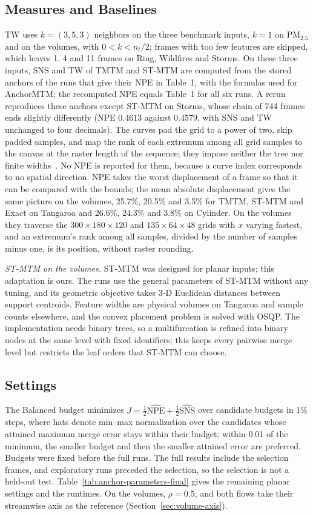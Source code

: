 \documentclass[preprint]{vgtc}
\begin{document}
\subsection{Measures and Baselines}
TW uses $k=(3,5,3)$ neighbors on the three benchmark inputs, $k=1$ on PM$_{2.5}$ and on the volumes, with $0<k<n_t/2$; frames with too few features are skipped, which leaves 1, 4 and 11 frames on Ring, Wildfires and Storms. On these three inputs, SNS and TW of TMTM and ST-MTM are computed from the stored anchors of the runs that give their NPE in Table~1, with the formulas used for AnchorMTM; the recomputed NPE equals Table~1 for all six runs. A rerun reproduces these anchors except ST-MTM on Storms, whose chain of 744 frames ends slightly differently (NPE 0.4613 against 0.4579, with SNS and TW unchanged to four decimals). The curves pad the grid to a power of two, skip padded samples, and map the rank of each extremum among all grid samples to the canvas at the raster length of the sequence; they impose neither the tree nor finite widths~\cite{Franke:2021:1DP}. No NPE is reported for them, because a curve index corresponds to no spatial direction. NPE takes the worst displacement of a frame so that it can be compared with the bounds; the mean absolute displacement gives the same picture on the volumes, 25.7\%, 20.5\% and 3.5\% for TMTM, ST-MTM and Exact on Tangaroa and 26.6\%, 24.3\% and 3.8\% on Cylinder. On the volumes they traverse the $300\times180\times120$ and $135\times64\times48$ grids with $x$ varying fastest, and an extremum's rank among all samples, divided by the number of samples minus one, is its position, without raster rounding.

\emph{ST-MTM on the volumes.} ST-MTM was designed for planar inputs; this adaptation is ours. The runs use the general parameters of ST-MTM without any tuning, and its geometric objective takes 3-D Euclidean distances between support centroids. Feature widths are physical volumes on Tangaroa and sample counts elsewhere, and the convex placement problem is solved with OSQP. The implementation needs binary trees, so a multifurcation is refined into binary nodes at the same level with fixed identifiers; this keeps every pairwise merge level but restricts the leaf orders that ST-MTM can choose.

\subsection{Settings}
The Balanced budget minimizes $J=\tfrac12\widehat{\mathrm{NPE}}+\tfrac12\widehat{\mathrm{SNS}}$ over candidate budgets in 1\% steps, where hats denote min--max normalization over the candidates whose attained maximum merge error stays within their budget; within 0.01 of the minimum, the smaller budget and then the smaller attained error are preferred. Budgets were fixed before the full runs. The full results include the selection frames, and exploratory runs preceded the selection, so the selection is not a held-out test. Table~\ref{tab:anchor-parameters-final} gives the remaining planar settings and the runtimes. On the volumes, $\rho=0.5$, and both flows take their streamwise axis as the reference (Section~\ref{sec:volume-axis}).
\end{document}
